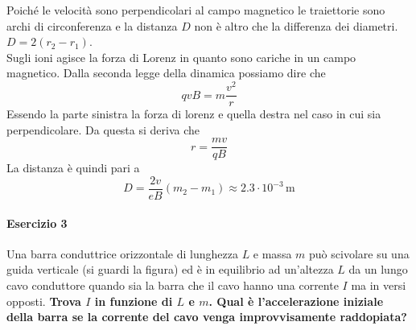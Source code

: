 Poiché le velocità sono perpendicolari al campo magnetico le traiettorie sono archi di circonferenza
e la distanza $D$ non è altro che la differenza dei diametri. $D = 2(r_2-r_1)$.\\
Sugli ioni agisce la forza di Lorenz in quanto sono cariche in un campo magnetico. Dalla seconda legge
della dinamica possiamo dire che
\begin{equation*}
  qvB = m\frac{v^2}{r}
\end{equation*}
Essendo la parte sinistra la forza di lorenz e quella destra nel caso in cui sia perpendicolare. Da
questa si deriva che
\begin{equation*}
  r = \frac{mv}{qB}
\end{equation*}
La distanza è quindi pari a
\begin{equation*}
  D = \frac{2v}{eB}(m_2-m_1) \approx \boxed{2.3\cdot10^{-3}\,\text{m}}
\end{equation*}

\paragraph{Esercizio 3}
Una barra conduttrice orizzontale di lunghezza $L$ e massa $m$ può scivolare su una guida verticale
(si guardi la figura) ed è in equilibrio ad un'altezza $L$ da un lungo cavo conduttore quando sia la
barra che il cavo hanno una corrente $I$ ma in versi opposti. \textbf{Trova $I$ in funzione di $L$ e
  $m$. Qual è l'accelerazione iniziale della barra se la corrente del cavo venga improvvisamente
raddopiata?}
\begin{center}
\end{center}
\divisor

